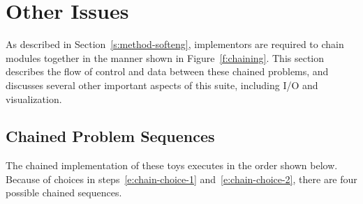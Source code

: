 \section{Other Issues\label{s:issues}}

As described in Section~\ref{s:method-softeng},
implementors are required to chain modules together in the manner shown in Figure~\ref{f:chaining}.
This section describes the flow of control and data between these chained problems,
and discusses several other important aspects of this suite,
including I/O and visualization.

\subsection{Chained Problem Sequences\label{s:issues-chain}}

The chained implementation of these toys executes in the order shown below.
Because of choices in steps~\ref{e:chain-choice-1} and~\ref{e:chain-choice-2},
there are four possible chained sequences.

